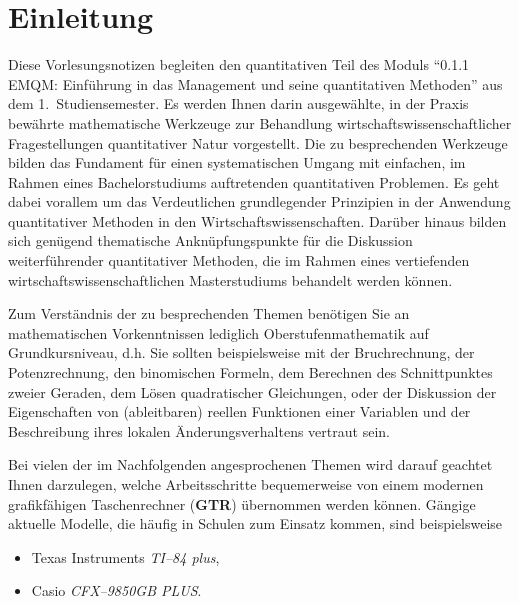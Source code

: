 \chapter*{Einleitung}
Diese Vorlesungsnotizen begleiten den quantitativen Teil des
Moduls "`0.1.1 EMQM: Einf\"uhrung in das Management und seine 
quantitativen Methoden"' aus dem 1.\ Studiensemester. Es werden
Ihnen darin ausgew\"ahlte, in der Praxis bew\"ahrte mathematische
Werkzeuge zur Behandlung wirtschaftswissenschaftlicher
Fragestellungen quantitativer Natur vorgestellt. Die zu
besprechenden Werkzeuge bilden das Fundament f\"ur einen
systematischen Umgang mit einfachen, im Rahmen eines
Bachelorstudiums auftretenden quantitativen Problemen. Es geht
dabei vorallem um das Verdeutlichen grundlegender Prinzipien in
der Anwendung quantitativer Methoden in den
Wirtschaftswissenschaften. Dar\"uber hinaus bilden sich gen\"ugend
thematische Ankn\"upfungspunkte f\"ur die Diskussion
weiterf\"uhrender quantitativer Methoden, die im Rahmen eines
vertiefenden wirtschaftswissenschaftlichen Masterstudiums
behandelt werden k\"onnen.

\medskip
\noindent
Zum Verst\"andnis der zu besprechenden Themen ben\"otigen Sie an
mathematischen Vorkenntnissen lediglich Oberstufenmathematik auf
Grundkursniveau, d.h. Sie sollten beispielsweise mit der
Bruchrechnung, der Potenzrechnung, den binomischen Formeln, dem
Berechnen des Schnittpunktes zweier Geraden, dem L\"osen
quadratischer Gleichungen, oder der Diskussion der Eigenschaften
von (ableitbaren) reellen Funktionen einer Variablen und der
Beschreibung ihres lokalen \"Anderungsverhaltens  vertraut sein.

\medskip
\noindent
Bei vielen der im Nachfolgenden angesprochenen Themen wird
darauf geachtet Ihnen darzulegen, welche Arbeitsschritte
bequemerweise von einem modernen grafikf\"ahigen Taschenrechner
({\bf GTR}) \"ubernommen werden k\"onnen. G\"angige aktuelle
Modelle, die h\"aufig in Schulen zum Einsatz kommen, sind
beispielsweise
%
\begin{itemize}
\item Texas Instruments {\em TI--84 plus\/},
\item Casio {\em CFX--9850GB PLUS\/}.
\end{itemize}
%

